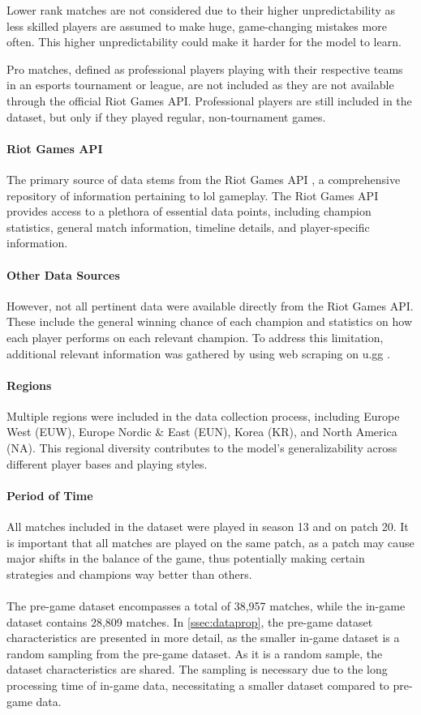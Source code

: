 \documentclass[12pt, a4paper, headinclude, twoside, plainheadsepline, open=right, numbers=noenddot, hidelinks, toc=listof, toc=bibliography]{scrreprt}
\begin{document}
Lower rank matches are not considered due to their higher unpredictability as less skilled players are assumed to make huge, game-changing mistakes more often.
This higher unpredictability could make it harder for the model to learn.

Pro matches, defined as professional players playing with their respective teams in an esports tournament or league, are not included as they are not available through the official Riot Games API.
Professional players are still included in the dataset, but only if they played regular, non-tournament games.

\paragraph{Riot Games API}
The primary source of data stems from the Riot Games API \cite{RiotDeveloperPortal}, a comprehensive repository of information pertaining to \ac{lol} gameplay.
The Riot Games API provides access to a plethora of essential data points, including champion statistics, general match information, timeline details, and player-specific information.

\paragraph{Other Data Sources}
However, not all pertinent data were available directly from the Riot Games API.
These include the general winning chance of each champion and statistics on how each player performs on each relevant champion.
To address this limitation, additional relevant information was gathered by using web scraping on u.gg \cite{GGBestLeague}.
\paragraph{Regions}
Multiple regions were included in the data collection process, including Europe West (EUW), Europe Nordic \& East (EUN), Korea (KR), and North America (NA).
This regional diversity contributes to the model's generalizability across different player bases and playing styles.
\paragraph{Period of Time}
All matches included in the dataset were played in season 13 and on patch 20.
It is important that all matches are played on the same patch, as a patch may cause major shifts in the balance of the game, thus potentially making certain strategies and champions way better than others.
\\\\
The pre-game dataset encompasses a total of 38,957 matches, while the in-game dataset contains 28,809 matches.
In \ref{ssec:dataprop}, the pre-game dataset characteristics are presented in more detail, as the smaller in-game dataset is a random sampling from the pre-game dataset. 
As it is a random sample, the dataset characteristics are shared. 
The sampling is necessary due to the long processing time of in-game data, necessitating a smaller dataset compared to pre-game data.
\end{document}
